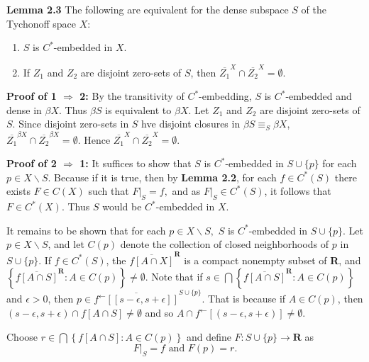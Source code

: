 \documentclass{article}
\begin{document}
\textbf{Lemma 2.3} The following are equivalent for the dense subspace $S$ of the Tychonoff space $X$: 
\begin{enumerate}
	\item $S$ is $C^*$-embedded in $X$. 
	\item If $Z_1$ and $Z_2$ are disjoint zero-sets of $S$, then $\overline{Z_1}^X\cap \overline{Z_2}^X=\emptyset$.
\end{enumerate}


\vskip 10pt

\textbf{Proof of 1 $\Rightarrow$ 2: }  By the transitivity of $C^*$-embedding, $S$ is $C^*$-embedded and dense in $\beta X$. Thus $\beta S$ is equivalent to $\beta X$. Let $Z_1$ and $Z_2$ are disjoint zero-sets of $S$. Since disjoint zero-sets in $S$ hve disjoint closures in $\beta S \equiv_S \beta X$, $\overline{Z_1}^{\beta X}\cap \overline{Z_2}^{\beta X}=\emptyset$. Hence $\overline{Z_1}^X\cap \overline{Z_2}^X=\emptyset$.


\vskip 20pt



\textbf{Proof of 2 $\Rightarrow$ 1: } It suffices to show that $S$ is $C^*$-embedded in $S\cup \{p\}$ for each $p\in X\backslash S$. Because if it is true, then by \textbf{Lemma 2.2}, for each $f\in C^*(S)$ there exists $F\in C(X)$ such that $F|_S=f, $ and as $F|_S\in C^*(S)$, it follows that $F\in C^*(X)$. Thus $S$ would be $C^*$-embedded in $X$.  


\vskip 15pt

It remains to be shown that for each $p\in X\backslash S,$ $S$ is $C^*$-embedded in $S\cup \{p\}$. Let $p\in X\backslash S$, and let $C(p)$ denote the collection of closed neighborhoods of $p$ in $S\cup \{p\}.$ If $f\in C^*(S)$, the $\overline{f\left[A\cap X\right]}^{\textbf{R}}$ is a compact nonempty subset of \textbf{R}, and $\left\{\overline{f\left[A\cap S\right]}^{\textbf{R}}: A\in C(p)\right\}\neq \emptyset$. Note that if $s\in \bigcap\left\{ \overline{f[A\cap S]}^{\textbf{R}}: A\in C(p)\right\}$ and $\epsilon>0$, then $p\in \overline{f^\leftarrow \left[ [s-\epsilon, s+\epsilon]\right]}^{S\cup \{p\}}$. That is because if $A\in C(p)$, then $(s-\epsilon, s+\epsilon)\cap f[A\cap S]\neq \emptyset$ and so $A\cap f^\leftarrow \left[(s-\epsilon, s+\epsilon)\right]\neq \emptyset.$ 

\vskip 10pt
 
Choose $r\in \bigcap \left\{f[A\cap S]: A\in C(p)\right\}$ and define $F:S\cup \{p\} \rightarrow \textbf{R}$ as
$$ F|_S=f \mbox{ and } F(p)=r.$$
\end{document}
